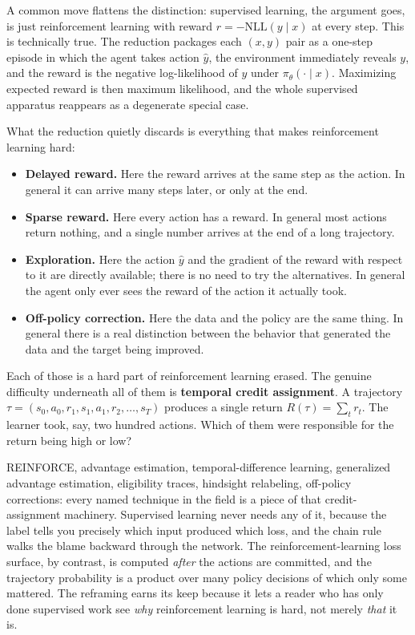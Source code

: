 A common move flattens the distinction: supervised learning, the argument
goes, is just reinforcement learning with reward $r = -\mathrm{NLL}(y \mid
x)$ at every step. This is technically true. The reduction packages each
$(x, y)$ pair as a one-step episode in which the agent takes action $\hat y$,
the environment immediately reveals $y$, and the reward is the negative
log-likelihood of $y$ under $\pi_\theta(\cdot \mid x)$. Maximizing expected
reward is then maximum likelihood, and the whole supervised apparatus
reappears as a degenerate special case.

What the reduction quietly discards is everything that makes reinforcement
learning hard:

\begin{itemize}
\item \textbf{Delayed reward.} Here the reward arrives at the same step as
the action. In general it can arrive many steps later, or only at the end.
\item \textbf{Sparse reward.} Here every action has a reward. In general most
actions return nothing, and a single number arrives at the end of a long
trajectory.
\item \textbf{Exploration.} Here the action $\hat y$ and the gradient of the
reward with respect to it are directly available; there is no need to try the
alternatives. In general the agent only ever sees the reward of the action it
actually took.
\item \textbf{Off-policy correction.} Here the data and the policy are the
same thing. In general there is a real distinction between the behavior that
generated the data and the target being improved.
\end{itemize}

Each of those is a hard part of reinforcement learning erased. The genuine
difficulty underneath all of them is \textbf{temporal credit assignment}. A
trajectory $\tau = (s_0, a_0, r_1, s_1, a_1, r_2, \ldots, s_T)$ produces a
single return $R(\tau) = \sum_t r_t$. The learner took, say, two hundred
actions. Which of them were responsible for the return being high or low?

REINFORCE, advantage estimation, temporal-difference learning, generalized
advantage estimation, eligibility traces, hindsight relabeling, off-policy
corrections: every named technique in the field is a piece of that
credit-assignment machinery. Supervised learning never needs any of it,
because the label tells you precisely which input produced which loss, and
the chain rule walks the blame backward through the network. The
reinforcement-learning loss surface, by contrast, is computed \emph{after}
the actions are committed, and the trajectory probability is a product over
many policy decisions of which only some mattered. The reframing earns its
keep because it lets a reader who has only done supervised work see
\emph{why} reinforcement learning is hard, not merely \emph{that} it is.

